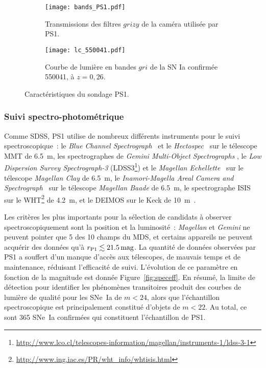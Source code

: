 \documentclass[../main/main.tex]{subfiles}
\begin{document}
\begin{figure}[ht]
    \centering
    \begin{subfigure}[]{.49\linewidth}
        \centering
        \texttt{[image: bands\_PS1.pdf]}
        \captionsetup{justification=centering}
        \caption{Transmissions des filtres $grizy$ de la caméra utilisée par
        PS1.}
        \label{fig:ps1bands}
    \end{subfigure}
    \begin{subfigure}[]{.49\linewidth}
        \centering
        \texttt{[image: lc\_550041.pdf]}
        \captionsetup{justification=centering}
        \caption{Courbe de lumière en bandes $gri$ de la SN Ia confirmée 550041,
        à $z = 0,26$.}
        \label{fig:lc_550041}
    \end{subfigure}
    \caption{Caractéristiques du sondage PS1.}
\end{figure}

\subsubsection{Suivi spectro-photométrique}\label{sssec:ps1spectro}

Comme SDSS, PS1 utilise de nombreux différents instruments pour le suivi
spectroscopique~: le \textit{Blue Channel Spectrograph}~\citep{schmidt1989} et
le \textit{Hectospec}~\citep{fabricant2005} sur le télescope MMT de \SI{6,5}{m},
les spectrographes de \textit{Gemini Multi-Object Spectrographs}
\citep[GMOS,][]{hook2004}, le \textit{Low Dispersion Survey Spectrograph-3}
(LDSS3\footnote{\href{http://www.lco.cl/telescopes-information/magellan/instruments-1/ldss-3-1}
{http://www.lco.cl/telescopes-information/magellan/instruments-1/ldss-3-1}}) et
le \textit{Magellan Echellette}~\citep[MagE,][]{marshall2008} sur le télescope
\textit{Magellan Clay} de \SI{6,5}{m}, le \textit{Inamori-Magella Areal Camera
and Spectrograph}~\citep[IMACS,][]{dressler2011} sur le télescope
\textit{Magellan Baade} de \SI{6,5}{m}, le spectrographe ISIS sur le
WHT\footnote{\href{http://www.ing.iac.es/PR/wht_info/whtisis.html}
{http://www.ing.iac.es/PR/wht\_info/whtisis.html}} de \SI{4,2}{m}, et le DEIMOS
\citep{faber2003} sur le Keck de \SI{10}{m}~\citep{oke1995}.

Les critères les plus importants pour la sélection de candidats à observer
spectroscopiquement sont la position et la luminosité~: \textit{Magellan} et
\textit{Gemini} ne peuvent pointer que 5 des 10 champs du MDS, et certains
appareils ne peuvent acquérir des données qu'à $r_{\rm P1} \lesssim
\SI{21,5}{mag}$. La quantité de données observées par PS1 a souffert d'un manque
d'accès aux télescopes, de mauvais temps et de maintenance, réduisant
l'efficacité de suivi. L'évolution de ce paramètre en fonction de la magnitude
est donnée Figure~\ref{fig:speceff}. En résumé, la limite de détection pour
identifier les phénomènes transitoires produit des courbes de lumière de qualité
pour les SNe~Ia de $m < 24$, alors que l'échantillon spectroscopique est
principalement constitué d'objets de $m < 22$. Au total, ce sont 365 SNe~Ia
confirmées qui constituent l'échantillon de PS1.
\end{document}
